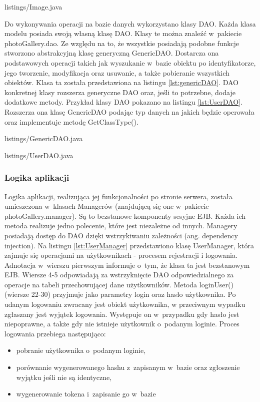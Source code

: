 
{listings/Image.java}

Do wykonywania operacji na bazie danych wykorzystano klasy DAO. Każda klasa
modelu posiada swoją własną klasę DAO. Klasy te można znaleźć w~pakiecie
photoGallery.dao. Ze względu na to, że wszystkie posiadają podobne funkcje
stworzono abstrakcyjną klasę generyczną GenericDAO. Dostarcza ona podstawowych
operacji takich jak wyszukanie w~bazie obiektu po identyfikatorze, jego
tworzenie, modyfikacja oraz usuwanie, a także pobieranie wszystkich obiektów. Klasa ta została przedstawiona na listingu
\ref{lst:genericDAO}. DAO konkretnej klasy rozszerza generyczne DAO oraz, jeśli
to potrzebne, dodaje dodatkowe metody. Przykład klasy DAO pokazano na listingu \ref{lst:UserDAO}. Rozszerza ona klasę GenericDAO podając typ danych na jakich będzie operowała oraz implementuje metodę GetClassType().

\newpage

{listings/GenericDAO.java}


{listings/UserDAO.java}

\subsubsection{Logika aplikacji}
Logika aplikacji, realizująca jej funkcjonalności po stronie serwera, została umieszczona w~klasach Managerów (znajdującą się one w~pakiecie photoGallery.manager). Są to bezstanowe komponenty sesyjne EJB. Każda ich metoda realizuje jedno polecenie, które jest niezależne od innych. Managery posiadają dostęp do DAO dzięki wstrzykiwaniu zależności (ang. dependency injection). Na listingu
\ref{lst:UserManager} przedstawiono klasę UserManager, która zajmuje się
operacjami na użytkownikach - procesem rejestracji i logowania. Adnotacja w~wierszu pierwszym informuje o~tym, że klasa ta
jest bezstanowym EJB. Wiersze 4-5 odpowiadają za wstrzyknięcie DAO
odpowiedzialnego za operacje na tabeli przechowującej dane użytkowników.
Metoda loginUser() (wiersze 22-30) przyjmuje jako parametry login oraz
hasło użytkownika. Po udanym logowaniu zwracany jest obiekt użytkownika, w
przeciwnym wypadku zgłaszany jest wyjątek logowania. Występuje on w~przypadku
gdy hasło jest niepoprawne, a także gdy nie istnieje użytkownik o~podanym loginie. Proces logowania przebiega następująco:
\begin{itemize}
	\item pobranie użytkownika o~podanym loginie,
	\item porównanie wygenerowanego hashu z~zapisanym w~bazie oraz zgłoszenie wyjątku jeśli nie są identyczne,
	\item wygenerowanie tokena i~zapisanie go w~bazie
\end{itemize}

